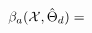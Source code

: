 \documentclass{article}
\begin{document}
\[
    \beta_a(\mathcal{X}, \hat{\Theta}_d) = 
    \begin{tikzpicture}

    \end{tikzpicture}
\]
\end{document}
